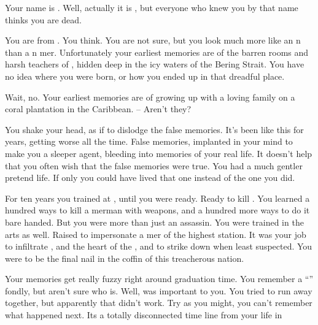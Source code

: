 \documentclass[char]{NeptuneBall}
\begin{document}
\name{\cAthena{}}



Your name is \cQueen{\MYname}. Well, actually it is \cQueen{}, but everyone who knew you by that name thinks you are dead.

You are from \pAtlantis{}. You think. You are not sure, but you look much more like an \pAtlantis{}n than a \pPacifica{}n mer\cQueen{\human{}}. Unfortunately your earliest memories are of the barren rooms and harsh teachers of \pAssassin{}, hidden deep in the icy waters of the Bering Strait. You have no idea where you were born, or how you ended up in that dreadful place. 

Wait, no. Your earliest memories are of growing up with a loving family on a coral plantation in the Caribbean. -- Aren't they?

You shake your head, as if to dislodge the false memories. It's been like this for years, getting worse all the time. False memories, implanted in your mind to make you a sleeper agent, bleeding into memories of your real life. It doesn't help that you often wish that the false memories were true. You had a much gentler pretend life. If only you could have lived that one instead of the one you did.

For ten years you trained at \pAssassin{}, until you were ready. Ready to kill \cKing{\King} \cKing{}. You learned a hundred ways to kill a merman with weapons, and a hundred more ways to do it bare handed. But you were more than just an assassin. You were trained in the arts as well. Raised to impersonate a mer\cAthena{\human} of the highest station. It was your job to infiltrate \pAtlantis{}, and the heart of the \cKing{\King}, and to strike \cKing{\them} down when \pAtlantis{} least suspected. You were to be the final nail in the coffin of this treacherous nation.

Your memories get really fuzzy right around graduation time.  You remember a ``\cDiplomat{}'' fondly, but aren't sure who \cDiplomat{\they} is. Well, \cDiplomat{\they} was important to you. You tried to run away together, but apparently that didn't work. Try as you might, you can't remember what happened next. Its a totally disconnected time line from your life in \pAtlantis{}
\end{document}
